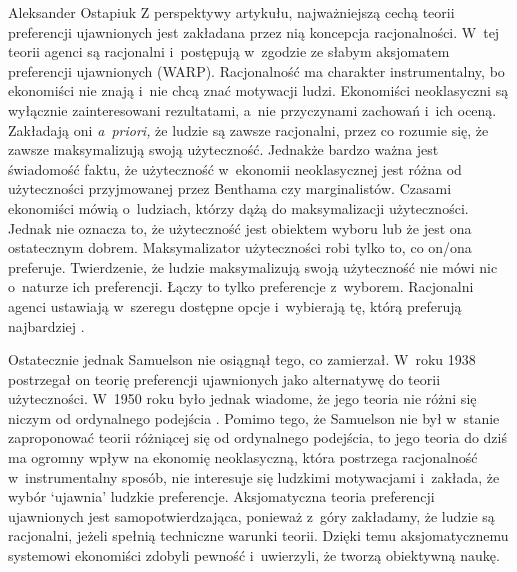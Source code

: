 \begin{artplenv}{Aleksander Ostapiuk}
Z perspektywy artykułu, najważniejszą cechą teorii preferencji ujawnionych jest zakładana przez nią koncepcja racjonalności.
W~tej teorii agenci są racjonalni i~postępują w~zgodzie ze słabym aksjomatem preferencji ujawnionych (WARP).
Racjonalność ma charakter instrumentalny, bo ekonomiści nie znają i~nie chcą znać motywacji ludzi. Ekonomiści
neoklasyczni są wyłącznie zainteresowani rezultatami, a~nie przyczynami zachowań i~ich oceną. Zakładają oni
\textit{a~priori,} że ludzie są zawsze racjonalni, przez co rozumie się, że zawsze maksymalizują swoją użyteczność. Jednakże
bardzo ważna jest świadomość faktu, że użyteczność w~ekonomii neoklasycznej jest różna od użyteczności przyjmowanej
przez Benthama czy marginalistów. Czasami ekonomiści mówią o~ludziach, którzy dążą do maksymalizacji użyteczności.
Jednak nie oznacza to, że użyteczność jest obiektem wyboru lub że jest ona ostatecznym dobrem. Maksymalizator
użyteczności robi tylko to, co on/ona preferuje. Twierdzenie, że ludzie maksymalizują swoją użyteczność nie mówi
nic o~naturze ich preferencji. Łączy to tylko preferencje z~wyborem. Racjonalni agenci ustawiają w~szeregu dostępne
opcje i~wybierają tę, którą preferują najbardziej
\parencite[s.~18]{hausman_inexact_1992}.

Ostatecznie jednak Samuelson nie osiągnął tego, co zamierzał. W~roku 1938 postrzegał on teorię preferencji ujawnionych
jako alternatywę do teorii użyteczności. W~1950 roku było jednak wiadome, że jego teoria nie różni się niczym od
ordynalnego podejścia
\parencite{wong_foundations_2006}.
Pomimo tego, że Samuelson nie był w~stanie
zaproponować teorii różniącej się od ordynalnego podejścia, to jego teoria do dziś ma ogromny wpływ na ekonomię
neoklasyczną, która postrzega racjonalność w~instrumentalny sposób, nie interesuje się ludzkimi motywacjami i~zakłada,
że wybór `ujawnia' ludzkie preferencje. Aksjomatyczna teoria preferencji ujawnionych jest samopotwierdzająca, ponieważ
z~góry zakładamy, że ludzie są racjonalni, jeżeli spełnią techniczne warunki teorii. Dzięki temu aksjomatycznemu
systemowi ekonomiści zdobyli pewność i~uwierzyli, że tworzą obiektywną naukę. 


\end{artplenv}

